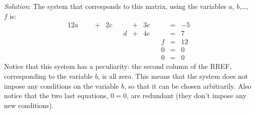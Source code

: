 \documentclass[12pt]{article}
\begin{document}
\begin{enumerate}
\emph{Solution}: The system that corresponds to this matrix, using the variables $a$, $b$,\dots, $f$ is:
\begin{alignat*}{12}
 a  &{}{}& &{}+{}& 2c&{}{}&   &{}+{}& 3e &{}{}&    &{}={}& -5\\
    &{}{}& &{}{}&    &{}{}& d &{}+{}& 4e &{}{}&    &{}={}&  7\\
    &{}{}& &{}{}&    &{}{}&   &{}{}&     &{}{}&  f &{}={}&  12\\
    &{}{}& &{}{}&    &{}{}&   &{}{}&     &{}{}&  0 &{}={}&  0\\
    &{}{}& &{}{}&    &{}{}&   &{}{}&     &{}{}&  0 &{}={}&  0
\end{alignat*}
Notice that this system has a peculiarity: the second column of the RREF, corresponding to the variable $b$, is all zero. This means that the system does not impose any conditions on the variable $b$, so that it can be chosen arbitrarily. Also notice that the two last equations, $0=0$, are redundant (they don't impose any new conditions). 


\end{enumerate}
\end{document}
